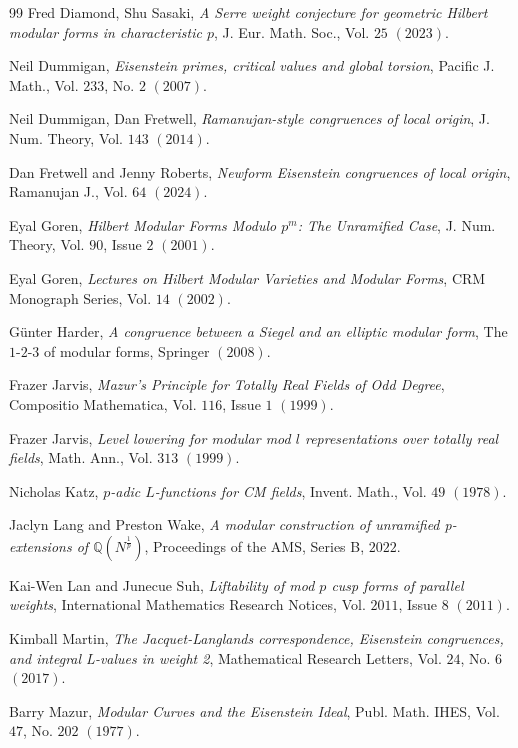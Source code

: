 \documentclass[a4paper,oneside]{amsart}
\theoremstyle{plain}
\theoremstyle{definition}
\begin{document}
\begin{thebibliography}{99}
Fred Diamond, Shu Sasaki, \emph{A Serre weight conjecture for geometric Hilbert modular forms in characteristic $p$}, J. Eur. Math. Soc., Vol. $25$ $(2023)$.

Neil Dummigan, \emph{Eisenstein primes, critical values and global torsion}, Pacific J. Math., Vol. $233$, No. $2$ $(2007)$.

Neil Dummigan, Dan Fretwell, \emph{Ramanujan-style congruences of local origin}, J. Num. Theory, Vol. $143$ $(2014)$.

Dan Fretwell and Jenny Roberts, \emph{Newform Eisenstein congruences of local origin}, Ramanujan J., Vol. $64$ $(2024)$.

Eyal Goren, \emph{Hilbert Modular Forms Modulo $p^m$: The Unramified Case}, J. Num. Theory, Vol. $90$, Issue $2$ $(2001)$.

Eyal Goren, \emph{Lectures on Hilbert Modular Varieties and Modular Forms}, CRM Monograph Series, Vol. $14$ $(2002)$.

G\"unter Harder, \emph{A congruence between a {S}iegel and an elliptic modular form}, The $1$-$2$-$3$ of modular forms, Springer $(2008)$.

Frazer Jarvis, \emph{Mazur's Principle for Totally Real Fields of Odd Degree}, Compositio Mathematica, Vol. $116$, Issue $1$ $(1999)$.

Frazer Jarvis, \emph{Level lowering for modular mod $l$ representations over totally real fields}, Math. Ann., Vol. $313$ $(1999)$.

Nicholas Katz, \emph{$p$-adic $L$-functions for CM fields}, Invent. Math., Vol. $49$ $(1978)$.

Jaclyn Lang and Preston Wake, \emph{A modular construction of unramified p-extensions of $\mathbb{Q}(N^{\frac{1}{p}})$}, Proceedings of the AMS, Series B, $2022$.

Kai-Wen Lan and Junecue Suh, \emph{Liftability of mod $p$ cusp forms of parallel weights}, International Mathematics Research Notices, Vol. $2011$, Issue $8$ $(2011)$.

Kimball Martin, \emph{The Jacquet-Langlands correspondence, Eisenstein congruences, and integral L-values in weight 2}, Mathematical Research Letters, Vol. $24$, No. $6$ $(2017)$.

Barry Mazur, \emph{Modular Curves and the Eisenstein Ideal}, Publ. Math. IHES, Vol. $47$, No. $202$ $(1977)$.


\end{thebibliography}
\end{document}
